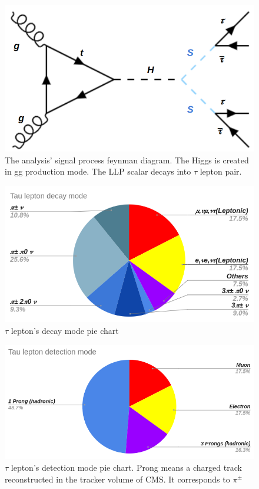 \begin{figure}[h!]
  \label{fig:sig}
  \centering
  \includegraphics[width=0.47\linewidth]{figs/sigprocess.png}
  \caption{The analysis' signal process feynman diagram. The Higgs is created in gg production mode. The LLP scalar decays into $\tau$ lepton pair.}
\end{figure}


\begin{figure}[h!]
  \label{fig:tdecay}
  \centering
  \includegraphics[width=0.87\linewidth]{figs/Taudec.png}
  \caption{$\tau$ lepton's decay mode pie chart}
\end{figure}

\begin{figure}[h!]
  \label{fig:tdet}
  \centering
  \includegraphics[width=0.87\linewidth]{figs/Taudet.png}
\caption{$\tau$ lepton's detection mode pie chart. Prong means a charged track reconstructed in the tracker volume of CMS. It corresponds to $\pi^{\pm}$}
\end{figure}


